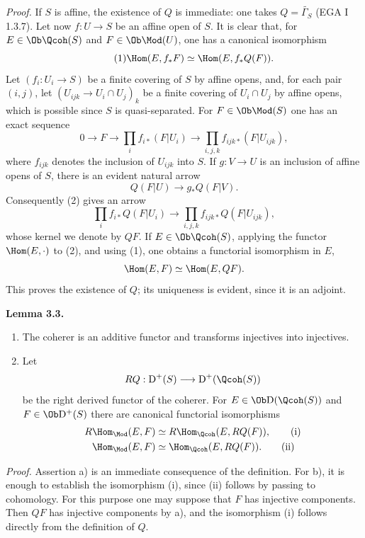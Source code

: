 \emph{Proof.} If $S$ is affine, the existence of $Q$ is immediate: one takes $Q=\widetilde{\Gamma_S}$ (EGA I 1.3.7). Let now $f:U\to S$ be an affine open of $S$. It is clear that, for $E\in\Ob\Qcoh(S)$ and $F\in\Ob\Mod(U)$, one has a canonical isomorphism
\begin{equation}\tag{1}
 \Hom(E,f_*F)\simeq \Hom(E,f_*Q(F)).
\end{equation}
Let $(f_i:U_i\to S)$ be a finite covering of $S$ by affine opens, and, for each pair $(i,j)$, let $(U_{ijk}\to U_i\cap U_j)_k$ be a finite covering of $U_i\cap U_j$ by affine opens, which is possible since $S$ is quasi-separated. For $F\in\Ob\Mod(S)$ one has an exact sequence
\begin{equation}\tag{2}
 0\longrightarrow F\longrightarrow \prod_i f_{i*}(F|U_i)
 \longrightarrow \prod_{i,j,k}f_{ijk*}(F|U_{ijk}),
\end{equation}
where $f_{ijk}$ denotes the inclusion of $U_{ijk}$ into $S$. If $g:V\to U$ is an inclusion of affine opens of $S$, there is an evident natural arrow
\[
 Q(F|U)\longrightarrow g_*Q(F|V).
\]
Consequently (2) gives an arrow
\begin{equation}\tag{3}
 \prod_i f_{i*}Q(F|U_i)\longrightarrow
 \prod_{i,j,k}f_{ijk*}Q(F|U_{ijk}),
\end{equation}
whose kernel we denote by $QF$. If $E\in\Ob\Qcoh(S)$, applying the functor $\Hom(E,\cdot)$ to (2), and using (1), one obtains a functorial isomorphism in $E$,
\[
 \Hom(E,F)\simeq\Hom(E,QF).
\]
This proves the existence of $Q$; its uniqueness is evident, since it is an adjoint.

\textbf{Lemma 3.3.} \begin{enumerate}[label=\alph*)]
\item The coherer is an additive functor and transforms injectives into injectives.
\item Let
\[
 RQ:\mathrm D^+(S)\longrightarrow \mathrm D^+(\Qcoh(S))
\]
be the right derived functor of the coherer. For $E\in\Ob\mathrm D(\Qcoh(S))$ and $F\in\Ob\mathrm D^+(S)$ there are canonical functorial isomorphisms
\begin{align}
 R\Hom_{\Mod}(E,F)&\simeq R\Hom_{\Qcoh}(E,RQ(F)), \tag{i}\\
 \Hom_{\Mod}(E,F)&\simeq \Hom_{\Qcoh}(E,RQ(F)). \tag{ii}
\end{align}
\end{enumerate}

\emph{Proof.} Assertion a) is an immediate consequence of the definition. For b), it is enough to establish the isomorphism (i), since (ii) follows by passing to cohomology. For this purpose one may suppose that $F$ has injective components. Then $QF$ has injective components by a), and the isomorphism (i) follows directly from the definition of $Q$.

